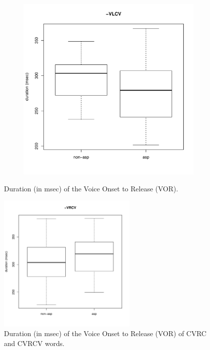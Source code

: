 \documentclass[11pt,a4paper,openany]{memoir}\usepackage[]{graphicx}\usepackage[]{color}
\newenvironment{knitrout}{}{} %
\begin{document}
\begin{figure}
\begin{subfigure}{.5\textwidth}
\begin{knitrout}
\end{knitrout}
\end{subfigure}
\begin{subfigure}{.5\textwidth}
\centering
\begin{knitrout}
\color{fgcolor}
\includegraphics[width=\textwidth]{img/di-lat-vor-1} 

\end{knitrout}
\end{subfigure}
\caption{Duration (in msec) of the Voice Onset to Release (VOR).}
\label{f:vor}
\end{figure}

\begin{figure}
\centering
\begin{knitrout}
\color{fgcolor}
\includegraphics[width=0.6\textwidth]{img/di-rho-vor-1} 

\end{knitrout}
\caption{Duration (in msec) of the Voice Onset to Release (VOR) of CVRC and CVRCV words.}
\label{f:vor-rho}
\end{figure}
\end{document}
